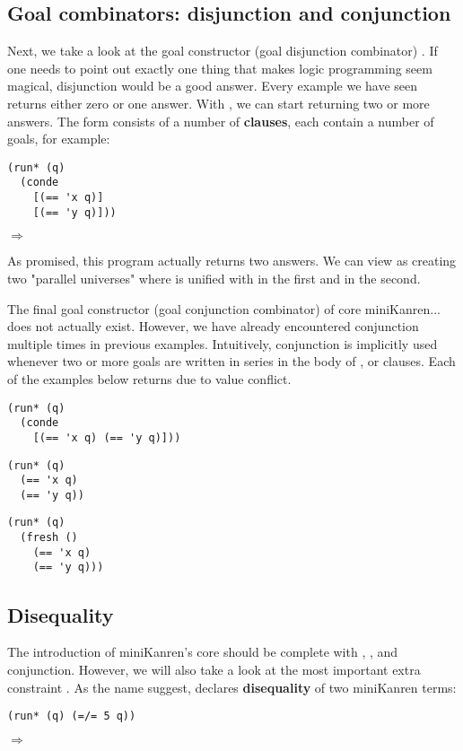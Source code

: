 \subsection{Goal combinators: disjunction and conjunction}
Next, we take a look at the goal constructor (goal disjunction combinator) .
If one needs to point out exactly one thing that makes logic programming seem magical, disjunction would be a good answer. Every example we have seen returns either zero or one answer. With , we can start returning two or more answers. The  form consists of a number of \textbf{clauses}, each contain a number of goals, for example:

\begin{lstlisting}
(run* (q)
  (conde
    [(== 'x q)]
    [(== 'y q)]))
\end{lstlisting}
$\Rightarrow$ 

As promised, this program actually returns two answers. We can view  as creating two "parallel universes" where  is unified with  in the first and  in the second.

The final goal constructor (goal conjunction combinator) of core miniKanren... does not actually exist. However, we have already encountered conjunction multiple times in previous examples. Intuitively, conjunction is implicitly used whenever two or more goals are written in series in the body of ,  or  clauses. Each of the examples below returns \code{()} due to value conflict.
\begin{lstlisting}
(run* (q)
  (conde
    [(== 'x q) (== 'y q)]))
\end{lstlisting}

\begin{lstlisting}
(run* (q)
  (== 'x q)
  (== 'y q))
\end{lstlisting}

\begin{lstlisting}
(run* (q)
  (fresh ()
    (== 'x q)
    (== 'y q)))
\end{lstlisting}

\subsection{Disequality}
The introduction of miniKanren's core should be complete with \code{==}, ,  and conjunction. However, we will also take a look at the most important extra constraint \code{=/=}. As the name suggest, \code{=/=} declares \textbf{disequality} of two miniKanren terms:
\begin{lstlisting}
(run* (q) (=/= 5 q))
\end{lstlisting}
$\Rightarrow$ 

